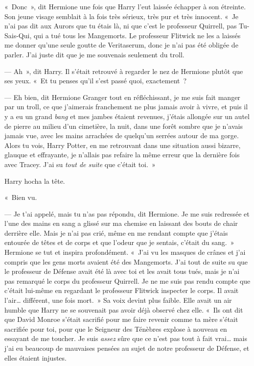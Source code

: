 «~Donc~», dit Hermione une fois que Harry l'eut laissée échapper à son étreinte. Son jeune visage semblait à la fois très sérieux, très pur et très innocent. «~Je n'ai pas dit aux Aurors que tu étais là, ni que c'est le professeur Quirrell, pas Tu-Sais-Qui, qui a tué tous les Mangemorts. Le professeur Flitwick ne les a laissés me donner qu'une seule goutte de Veritaserum, donc je n'ai pas été obligée de parler. J'ai juste dit que je me souvenais seulement du troll.

--- Ah~», dit Harry. Il s'était retrouvé à regarder le nez de Hermione plutôt que ses yeux. «~Et tu penses qu'il s'est passé quoi, exactement~?

--- Eh bien, dit Hermione Granger tout en réfléchissant, je me suis fait manger par un troll, ce que j'aimerais franchement ne plus jamais avoir à vivre, et puis il y a eu un grand \emph{bang} et mes jambes étaient revenues, j'étais allongée sur un autel de pierre au milieu d'un cimetière, la nuit, dans une forêt sombre que je n'avais jamais vue, avec les mains arrachées de quelqu'un serrées autour de ma gorge. Alors tu vois, Harry Potter, en me retrouvant dans une situation aussi bizarre, glauque et effrayante, je n'allais pas refaire la même erreur que la dernière fois avec Tracey. J'ai su \emph{tout de suite} que c'était toi.~»

Harry hocha la tête.

«~Bien vu.

--- Je t'ai appelé, mais tu n'as pas répondu, dit Hermione. Je me suis redressée et l'une des mains en sang a glissé sur ma chemise en laissant des bouts de chair derrière elle. Mais je n'ai pas crié, même en me rendant compte que j'étais entourée de têtes et de corps et que l'odeur que je sentais, c'était du sang.~» Hermione se tut et inspira profondément. «~J'ai vu les masques de crânes et j'ai compris que les gens morts avaient été des Mangemorts. J'ai tout de suite su que le professeur de Défense avait été là avec toi et les avait tous tués, mais je n'ai pas remarqué le corps du professeur Quirrell. Je ne me suis pas rendu compte que c'était lui-même en regardant le professeur Flitwick inspecter le corps. Il avait l'air… différent, une fois mort.~» Sa voix devint plus faible. Elle avait un air humble que Harry ne se souvenait pas avoir déjà observé chez elle. «~Ils ont dit que David Monroe s'était sacrifié pour me faire revenir comme ta mère s'était sacrifiée pour toi, pour que le Seigneur des Ténèbres explose à nouveau en essayant de me toucher. Je suis \emph{assez} sûre que ce n'est pas tout à fait vrai… mais j'ai eu beaucoup de mauvaises pensées au sujet de notre professeur de Défense, et elles étaient injustes.

